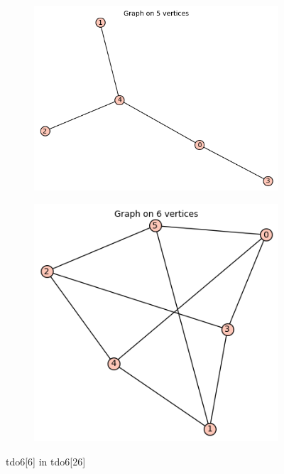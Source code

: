 \documentclass[12pt, a4paper]{article}
\begin{document}
\begin{center}
\begin{figure}[!htb]
\centering
\begin{subfigure}{0.5\textwidth}
  \centering
  \includegraphics[width=0.6\linewidth]{tdo6[6]}
\end{subfigure}%
\begin{subfigure}{0.5\textwidth}
  \centering
  \includegraphics[width=0.5\linewidth]{tdo6[26]}
\end{subfigure}
\caption{tdo6[6] in tdo6[26]}
\label{fig:test}
\end{figure}


\end{center}
\end{document}

